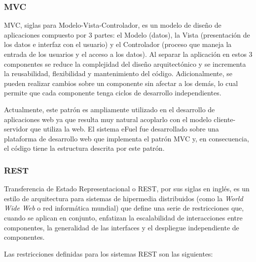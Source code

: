 \subsubsection{MVC} \label{mvc}
MVC, siglas para Modelo-Vista-Controlador, es un modelo de diseño de aplicaciones compuesto por 3 partes: el Modelo (datos), la Vista (presentación de los datos e interfaz con el usuario) y el Controlador (proceso que maneja la entrada de los usuarios y el acceso a los datos). \cite{mvcKrasner} Al separar la aplicación en estos 3 componentes se reduce la complejidad del diseño arquitectónico y se incrementa la reusabilidad, flexibilidad y mantenimiento del código. Adicionalmente, se pueden realizar cambios sobre un componente sin afectar a los demás, lo cual permite que cada componente tenga ciclos de desarrollo independientes.

Actualmente, este patrón es ampliamente utilizado en el desarrollo de aplicaciones web ya que resulta muy natural acoplarlo con el modelo cliente-servidor que utiliza la web. El sistema eFuel fue desarrollado sobre una plataforma de desarrollo web que implementa el patrón MVC y, en consecuencia, el código tiene la estructura descrita por este patrón.

\subsubsection{REST}
Transferencia de Estado Representacional o REST, por sus siglas en inglés, es un estilo de arquitectura para sistemas de hipermedia distribuidos (como la \textit{World Wide Web} o red informática mundial) que define una serie de restricciones que, cuando se aplican en conjunto, enfatizan la escalabilidad de interacciones entre componentes, la generalidad de las interfaces y el despliegue independiente de componentes. \cite{restFielding}

Las restricciones definidas para los sistemas REST son las siguientes:

